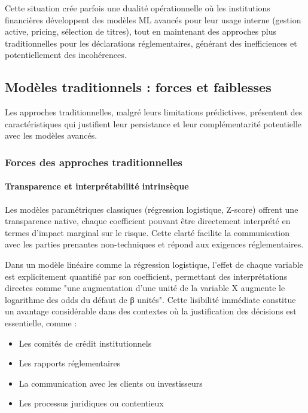 Cette situation crée parfois une dualité opérationnelle où les institutions financières développent des modèles ML avancés pour leur usage interne (gestion active, pricing, sélection de titres), tout en maintenant des approches plus traditionnelles pour les déclarations réglementaires, générant des inefficiences et potentiellement des incohérences.

\subsection{Modèles traditionnels : forces et faiblesses}

Les approches traditionnelles, malgré leurs limitations prédictives, présentent des caractéristiques qui justifient leur persistance et leur complémentarité potentielle avec les modèles avancés.

\subsubsection{Forces des approches traditionnelles}

\paragraph{Transparence et interprétabilité intrinsèque}

Les modèles paramétriques classiques (régression logistique, Z-score) offrent une transparence native, chaque coefficient pouvant être directement interprété en termes d'impact marginal sur le risque. Cette clarté facilite la communication avec les parties prenantes non-techniques et répond aux exigences réglementaires.

Dans un modèle linéaire comme la régression logistique, l'effet de chaque variable est explicitement quantifié par son coefficient, permettant des interprétations directes comme "une augmentation d'une unité de la variable X augmente le logarithme des odds du défaut de β unités". Cette lisibilité immédiate constitue un avantage considérable dans des contextes où la justification des décisions est essentielle, comme :
\begin{itemize}
    \item Les comités de crédit institutionnels
    \item Les rapports réglementaires
    \item La communication avec les clients ou investisseurs
    \item Les processus juridiques ou contentieux
\end{itemize}

